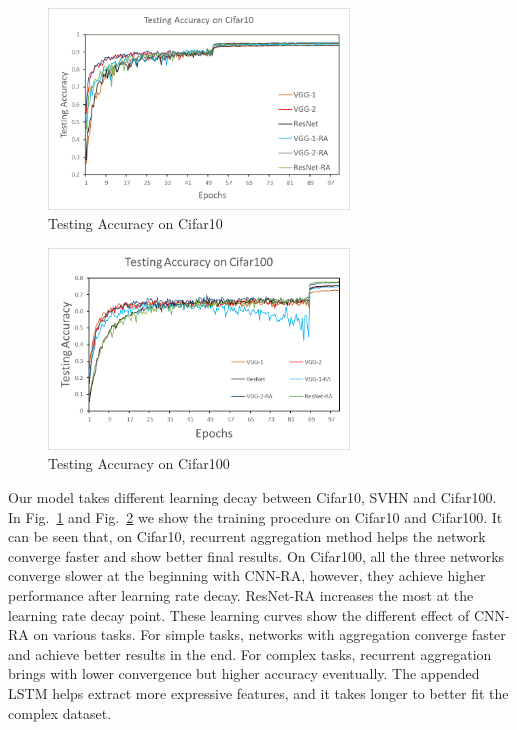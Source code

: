\documentclass[runningheads]{llncs}
\begin{document}
\begin{figure}   
	\centering
	\includegraphics[width=8cm]{Figures/cifar10.png}
	\caption{Testing Accuracy on Cifar10}
	\label{fig:Cifar10}
\end{figure}
\begin{figure}  
	\centering
	\includegraphics[width=8cm]{Figures/cifar100.png}
	\caption{Testing Accuracy on Cifar100}
	\label{fig:Cifar100}
\end{figure}

Our model takes different learning decay between Cifar10, SVHN and Cifar100. In Fig.~\ref{fig:Cifar10} and Fig.~\ref{fig:Cifar100} we show the training procedure on Cifar10 and Cifar100. It can be seen that, on Cifar10, recurrent aggregation method helps the network converge faster and show better final results. On Cifar100, all the three networks converge slower at the beginning with CNN-RA, however, they achieve higher performance after learning rate decay. ResNet-RA increases the most at the learning rate decay point. These learning curves show the different effect of CNN-RA on various tasks. For simple tasks, networks with aggregation converge faster and achieve better results in the end. For complex tasks, recurrent aggregation brings with lower convergence but higher accuracy eventually. The appended LSTM helps extract more expressive features, and it takes longer to better fit the complex dataset.
\end{document}
